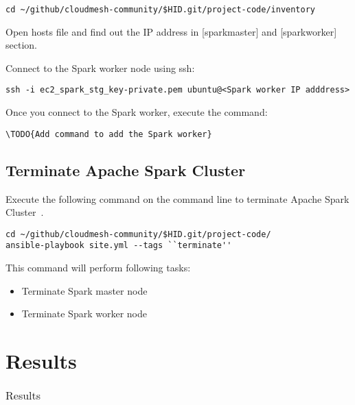 \begin{verbatim}
cd ~/github/cloudmesh-community/$HID.git/project-code/inventory
\end{verbatim}

Open hosts file and find out the IP address in [sparkmaster] and [sparkworker] section.

Connect to the Spark worker node using ssh:

\begin{verbatim}
ssh -i ec2_spark_stg_key-private.pem ubuntu@<Spark worker IP adddress>
\end{verbatim}

Once you connect to the Spark worker, execute the command:

\begin{verbatim}
\TODO{Add command to add the Spark worker}
\end{verbatim}

\subsection{Terminate Apache Spark Cluster}

Execute the following command on the command line to terminate Apache
Spark Cluster~\cite{hid-sp18-511-www-spark}.

\begin{verbatim}
cd ~/github/cloudmesh-community/$HID.git/project-code/
ansible-playbook site.yml --tags ``terminate''
\end{verbatim}

This command will perform following tasks:

\begin{itemize}
	\item Terminate Spark master node
	\item Terminate Spark worker node
\end{itemize}

\section{Results}

\begin{table}[hbt]
	\centering \caption{Results}\label{t:results-table} \begin{tabular}{llll} \end{tabular}
\end{table}


